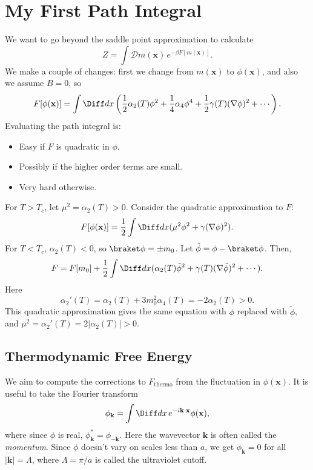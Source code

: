 \documentclass[12pt]{article}
\begin{document}

\newpage

\section{My First Path Integral}%
\label{sec:mlp}

We want to go beyond the saddle point approximation to calculate
\[
	Z = \int \mathcal{D} m(\mathbf{x}) \, e^{-\beta F[m(\mathbf{x})]}.
\]
We make a couple of changes: first we change from $m(\mathbf{x})$ to $\phi(\mathbf{x})$, and also we assume $B = 0$, so
\[
	F[\phi(\mathbf{x})] = \int \Diff dx \left( \frac{1}{2} \alpha_2(T) \phi^2 + \frac{1}{4} \alpha_4 \phi^4 + \frac{1}{2}\gamma(T) (\nabla \phi)^2 + \cdots \right).
\]
Evaluating the path integral is:
\begin{itemize}
	\item Easy if $F$ is quadratic in $\phi$.
	\item Possibly if the higher order terms are small.
	\item Very hard otherwise.
\end{itemize}

For $T > T_c$, let $\mu^2 = \alpha_2(T) > 0$. Consider the quadratic approximation to $F$:
\[
	F[\phi(\mathbf{x})] = \frac{1}{2} \int \Diff dx (\mu^2 \phi^2 + \gamma (\nabla \phi)^2).
\]
For $T < T_c$, $\alpha_2(T) < 0$, so $\braket \phi = \pm m_0$. Let $\tilde \phi = \phi - \braket \phi$. Then,
\[
	F = F[m_0] + \frac{1}{2} \int \Diff dx (\alpha_2(T) \tilde \phi^2 + \gamma(T) (\nabla \tilde \phi)^2 + \cdots).
\]
Here
\[
\alpha_2'(T) = \alpha_2(T) + 3 m_0^2 \alpha_4(T) = -2 \alpha_2(T) > 0.
\]
This quadratic approximation gives the same equation with $\phi$ replaced with $\tilde \phi$, and $\mu^2 = \alpha_2'(T) = 2|\alpha_2(T)| > 0$.

\subsection{Thermodynamic Free Energy}%
\label{sub:tfe}

We aim to compute the corrections to $F_{\mathrm{thermo}}$ from the fluctuation in $\phi(\mathbf{x})$. It is useful to take the Fourier transform
\[
\phi_{\mathbf{k}} = \int \Diff d x \, e^{-i \mathbf{k} \cdot \mathbf{x}} \phi(\mathbf{x}),
\]
where since $\phi$ is real, $\phi^\ast_{\mathbf{k}} = \phi_{-{\mathbf{k}}}$. Here the wavevector $\mathbf{k}$ is often called the \emph{momentum}. Since $\phi$ doesn't vary on scales less than $a$, we get $\phi_{\mathbf{k}} = 0$ for all $|\mathbf{k}| = \Lambda$, where $\Lambda = \pi/a$ is called the ultraviolet cutoff.
\end{document}
